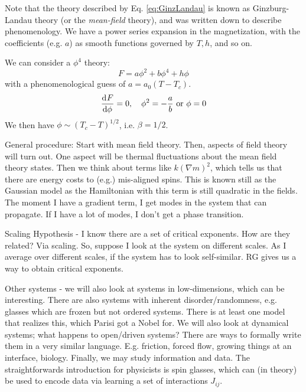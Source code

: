 Note that the theory described by Eq. \eqref{eq:GinzLandau} is known as Ginzburg-Landau theory (or the \emph{mean-field} theory), and was written down to describe phenomenology. We have a power series expansion in the magnetization, with the coefficients (e.g. $a$) as smooth functions governed by $T, h$, and so on.

We can consider a $\phi^4$ theory:
\begin{equation}
    F = a\phi^2 + b\phi^4 + h\phi
\end{equation}
with a phenomenological guess of $a = a_0(T - T_c)$.
\begin{equation}
    \dod{F}{\phi} = 0, \quad \phi^2 = -\frac{a}{b} \text{ or } \phi = 0
\end{equation}
We then have $\phi \sim (T_c - T)^{1/2}$, i.e. $\beta = 1/2$.

General procedure: Start with mean field theory. Then, aspects of field theory will turn out. One aspect will be thermal fluctuations about the mean field theory states. Then we think about terms like $k(\nabla m)^2$, which tells us that there are energy costs to (e.g.) mis-aligned spins. This is known still as the Gaussian model as the Hamiltonian with this term is still quadratic in the fields. The moment I have a gradient term, I get modes in the system that can propagate. If I have a lot of modes, I don't get a phase transition.

Scaling Hypothesis - I know there are a set of critical exponents. How are they related? Via scaling. So, suppose I look at the system on different scales. As I average over different scales, if the system has to look self-similar. RG gives us a way to obtain critical exponents.

Other systems - we will also look at systems in low-dimensions, which can be interesting. There are also systems with inherent disorder/randomness, e.g. glasses which are frozen but not ordered systems. There is at least one model that realizes this, which Parisi got a Nobel for. We will also look at dynamical systems; what happens to open/driven systems? There are ways to formally write them in a very similar language. E.g. friction, forced flow, growing things at an interface, biology. Finally, we may study information and data. The straightforwards introduction for physicists is spin glasses, which can (in theory) be used to encode data via learning a set of interactions $J_{ij}$. 